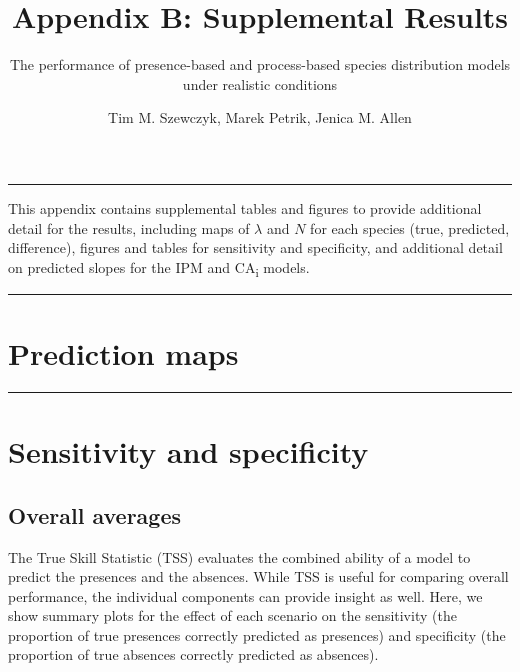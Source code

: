 \documentclass[]{article}
\title{Appendix B: Supplemental Results}
\subtitle{The performance of presence-based and process-based species distribution
models under realistic conditions}
\author{Tim M. Szewczyk, Marek Petrik, Jenica M. Allen}
\date{}
\begin{document}
\maketitle

{
\setcounter{tocdepth}{1}
\tableofcontents
}
\setcounter{table}{0}  \renewcommand{\thetable}{B.\arabic{table}} \setcounter{figure}{0} \renewcommand{\thefigure}{B.\arabic{figure}}

\begin{center}\rule{0.5\linewidth}{\linethickness}\end{center}

This appendix contains supplemental tables and figures to provide
additional detail for the results, including maps of \(\lambda\) and
\(N\) for each species (true, predicted, difference), figures and tables
for sensitivity and specificity, and additional detail on predicted
slopes for the IPM and CA\textsubscript{i} models.

\begin{center}\rule{0.5\linewidth}{\linethickness}\end{center}

\section{Prediction maps}

\begin{center}\rule{0.5\linewidth}{\linethickness}\end{center}

\newpage
\section{Sensitivity and specificity}

\subsection{Overall averages}

The True Skill Statistic (TSS) evaluates the combined ability of a model
to predict the presences and the absences. While TSS is useful for
comparing overall performance, the individual components can provide
insight as well. Here, we show summary plots for the effect of each
scenario on the sensitivity (the proportion of true presences correctly
predicted as presences) and specificity (the proportion of true absences
correctly predicted as absences).
\end{document}
